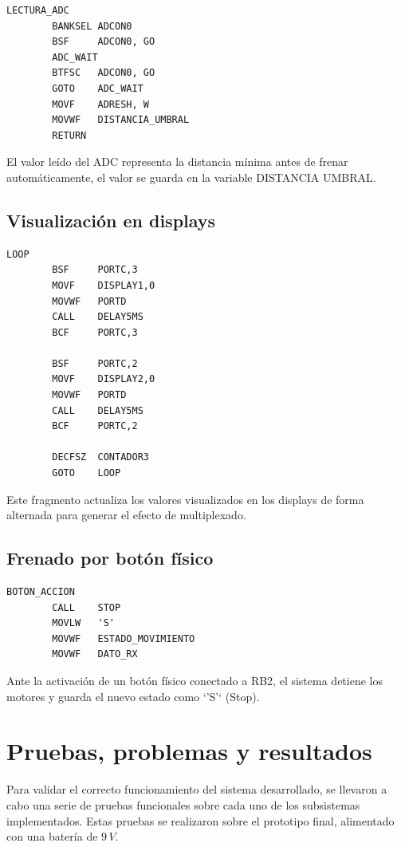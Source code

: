 \documentclass[]{article}
\begin{document}
	\begin{lstlisting}[caption={Lectura del valor de frenado}, label={lst:adc}]
		LECTURA_ADC
		BANKSEL ADCON0
		BSF     ADCON0, GO
		ADC_WAIT
		BTFSC   ADCON0, GO
		GOTO    ADC_WAIT
		MOVF    ADRESH, W
		MOVWF   DISTANCIA_UMBRAL
		RETURN
	\end{lstlisting}
	
	El valor leído del ADC representa la distancia mínima antes de frenar automáticamente, el valor se guarda en la variable DISTANCIA UMBRAL.
	
	\newpage
	\thispagestyle{fancy}
	
	\subsection{Visualización en displays}
	
	\begin{lstlisting}[caption={Multiplexado de displays de 7 segmentos}, label={lst:display}]
		LOOP
		BSF     PORTC,3
		MOVF    DISPLAY1,0
		MOVWF   PORTD
		CALL    DELAY5MS
		BCF     PORTC,3
		
		BSF     PORTC,2
		MOVF    DISPLAY2,0
		MOVWF   PORTD
		CALL    DELAY5MS
		BCF     PORTC,2
		
		DECFSZ  CONTADOR3
		GOTO    LOOP
	\end{lstlisting}
	
	Este fragmento actualiza los valores visualizados en los displays de forma alternada para generar el efecto de multiplexado.
	
	\subsection{Frenado por botón físico}
	
	\begin{lstlisting}[caption={Frenado de emergencia}, label={lst:boton}]
		BOTON_ACCION
		CALL    STOP
		MOVLW   'S'
		MOVWF   ESTADO_MOVIMIENTO
		MOVWF   DATO_RX
	\end{lstlisting}
	
	Ante la activación de un botón físico conectado a RB2, el sistema detiene los motores y guarda el nuevo estado como `'S'` (Stop).
	
	\section{Pruebas, problemas y resultados}
	
	Para validar el correcto funcionamiento del sistema desarrollado, se llevaron a cabo una serie de pruebas funcionales sobre cada uno de los subsistemas implementados. Estas pruebas se realizaron sobre el prototipo final, alimentado con una batería de $9\,V$.
	
\end{document}
